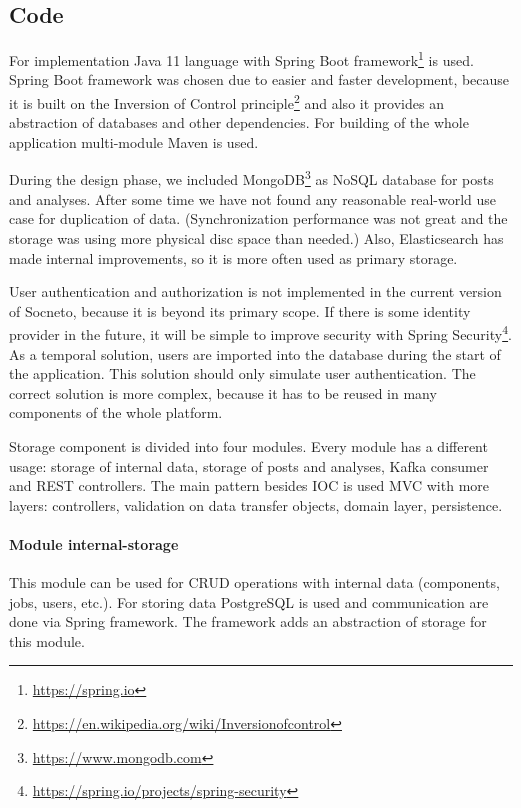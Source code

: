 \subsection{Code}

For implementation Java 11 language with Spring Boot framework\footnote{\url{https://spring.io}} is used. Spring Boot framework was chosen due to easier and faster development, because it is built on the Inversion of Control principle\footnote{\url{https://en.wikipedia.org/wiki/Inversionofcontrol}} and also it provides an abstraction of databases and other dependencies. For building of the whole application multi-module Maven is used.

During the design phase, we included MongoDB\footnote{\url{https://www.mongodb.com}} as NoSQL database for posts and analyses. After some time we have not found any reasonable real-world use case for duplication of data. (Synchronization performance was not great and the storage was using more physical disc space than needed.) Also, Elasticsearch has made internal improvements, so it is more often used as primary storage. 

User authentication and authorization is not implemented in the current version of Socneto, because it is beyond its primary scope. If there is some identity provider in the future, it will be simple to improve security with Spring Security\footnote{\url{https://spring.io/projects/spring-security}}. As a temporal solution, users are imported into the database during the start of the application. This solution should only simulate user authentication. The correct solution is more complex, because it has to be reused in many components of the whole platform.

Storage component is divided into four modules. Every module has a different usage: storage of internal data, storage of posts and analyses, Kafka consumer and REST controllers. The main pattern besides IOC is used MVC with more layers: controllers, validation on data transfer objects, domain layer, persistence.


\paragraph{Module internal-storage}

This module can be used for CRUD operations with internal data (components, jobs, users, etc.). For storing data PostgreSQL is used and communication are done via Spring framework. The framework adds an abstraction of storage for this module.

